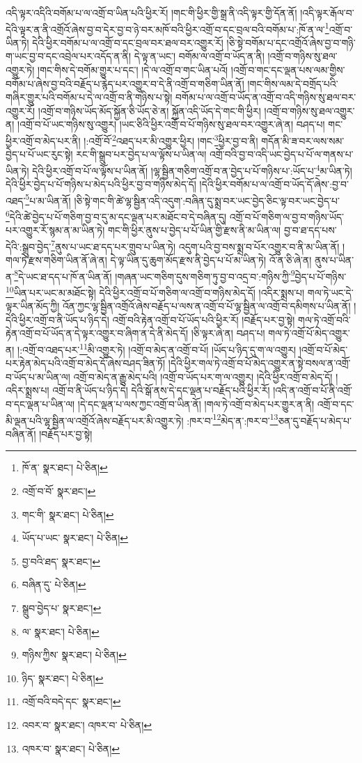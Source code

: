 འདི་ལྟར་འདིའི་བགོམ་པ་ལ་འགྲོ་བ་ཡིན་པའི་ཕྱིར་རོ། །གང་གི་ཕྱིར་གྱི་སྒྲ་ནི་འདི་ལྟར་གྱི་དོན་ནོ། །འདི་ལྟར་རྒོལ་བ་དེའི་ལྟར་ན་ནི་འགྲོའོ་ཞེས་བྱ་བ་དེར་བྱ་བ་ཉེ་བར་མཁོ་བའི་ཕྱིར་འགྲོ་བ་དང་བྲལ་བའི་བགོམ་པ་:ཁོ་ན་ལ་\footnote{ཁོ་ན་  སྣར་ཐང་།  པེ་ཅིན། }འགྲོ་བ་ཡིན་ཏེ། དེའི་ཕྱིར་བགོམ་པ་ལ་འགྲོ་བ་དང་བྲལ་བར་ཐལ་བར་འགྱུར་རོ། །ཅི་སྟེ་བགོམ་པ་དང་འགྲོའོ་ཞེས་བྱ་བ་གཉི་ག་ཡང་བྱ་བ་དང་འབྲེལ་པར་འདོད་ན་ནི། དེ་ལྟ་ན་ཡང་། བགོམ་ལ་འགྲོ་བ་ཡོད་ན་ནི། །འགྲོ་བ་གཉིས་སུ་ཐལ་འགྱུར་ཏེ། །གང་གིས་དེ་བགོམ་གྱུར་པ་དང་། །དེ་ལ་འགྲོ་བ་གང་ཡིན་པའོ། །འགྲོ་བ་གང་དང་ལྡན་པས་ལམ་གྱིས་བགོམ་པ་ཞེས་བྱ་བའི་བརྗོད་པ་རྙེད་པར་འགྱུར་བ་དེ་ནི་འགྲོ་བ་གཅིག་ཡིན་ནོ། །གང་གིས་ལམ་དེ་བགྲོད་པའི་གཞིར་གྱུར་པའི་བགོམ་པ་དེ་ལ་འགྲོ་བ་ནི་གཉིས་པ་སྟེ། བགོམ་པ་ལ་འགྲོ་བ་ཡོད་ན་འགྲོ་བ་འདི་གཉིས་སུ་ཐལ་བར་འགྱུར་རོ། །འགྲོ་བ་གཉིས་ཡོད་མོད་སྐྱོན་ཅི་ཡོད་ཅེ་ན། སྐྱོན་འདི་ཡོད་དེ་གང་གི་ཕྱིར། །འགྲོ་བ་གཉིས་སུ་ཐལ་འགྱུར་ན། །འགྲོ་བ་པོ་ཡང་གཉིས་སུ་འགྱུར། །ཡང་ཅིའི་ཕྱིར་འགྲོ་བ་པོ་གཉིས་སུ་ཐལ་བར་འགྱུར་ཞེ་ན། བཤད་པ། གང་ཕྱིར་འགྲོ་བ་མེད་པར་ནི། །:འགྲོ་བོ་\footnote{འགྲོ་བ་བོ་  སྣར་ཐང་། }འཐད་པར་མི་འགྱུར་ཕྱིར། །གང་\footnote{གང་གི་  སྣར་ཐང་།  པེ་ཅིན། }ཕྱིར་བྱ་བ་ནི། གདོན་མི་ཟ་བར་ལས་སམ་བྱེད་པ་པོ་ཡང་རུང་སྟེ། རང་གི་སྒྲུབ་པར་བྱེད་པ་ལ་ལྟོས་པ་ཡིན་ལ། འགྲོ་བའི་བྱ་བ་འདི་ཡང་བྱེད་པ་པོ་ལ་གནས་པ་ཡིན་ཏེ། དེའི་ཕྱིར་འགྲོ་བ་པོ་ལ་ལྟོས་པ་ཡིན་ནོ། །ལྷ་སྦྱིན་གཅིག་འགྲོ་བ་ན་བྱེད་པ་པོ་གཉིས་པ་:ཡོད་པ་\footnote{ཡོད་པ་ཡང་  སྣར་ཐང་།  པེ་ཅིན། }མ་ཡིན་ཏེ། དེའི་ཕྱིར་བྱེད་པ་པོ་གཉིས་པ་མེད་པའི་ཕྱིར་བྱ་བ་གཉིས་མེད་དོ། །དེའི་ཕྱིར་བགོམ་པ་ལ་འགྲོ་བ་ཡོད་དོ་ཞེས་:བྱ་བ་འཐད་\footnote{བྱ་བའི་ཐད་  སྣར་ཐང་། }པ་མ་ཡིན་ནོ། །ཅི་སྟེ་གང་གི་ཚེ་ལྷ་སྦྱིན་འདི་འདུག་:བཞིན་དུ་སྨྲ་བར་ཡང་བྱེད་ཅིང་ལྟ་བར་ཡང་བྱེད་པ་\footnote{བཞིན་དུ་  པེ་ཅིན། }དེའི་ཚེ་བྱེད་པ་པོ་གཅིག་བྱ་བ་དུ་མ་དང་ལྡན་པར་མཐོང་བ་དེ་བཞིན་དུ། འགྲོ་བ་པོ་གཅིག་ལ་བྱ་བ་གཉིས་ཡོད་པར་འགྱུར་རོ་སྙམ་ན་མ་ཡིན་ཏེ། གང་གི་ཕྱིར་ནུས་པ་བྱེད་པ་པོ་ཡིན་གྱི་རྫས་ནི་མ་ཡིན་ལ། བྱ་བ་ཐ་དད་པས་དེའི་:སྒྲུབ་བྱེད་\footnote{སྒྲུབ་བྱེད་པ་  སྣར་ཐང་། }ནུས་པ་ཡང་ཐ་དད་པར་གྲུབ་པ་ཡིན་ཏེ། འདུག་པའི་བྱ་བས་སྨྲ་བ་པོར་འགྱུར་བ་ནི་མ་ཡིན་ནོ། །གལ་ཏེ་རྫས་གཅིག་ཡིན་ནོ་ཞེ་ན། དེ་ལྟ་ཡིན་དུ་ཆུག་མོད་རྫས་ནི་བྱེད་པ་པོ་མ་ཡིན་ཏེ། འོ་ན་ཅི་ཞེ་ན། ནུས་པ་ཡིན་ན་\footnote{ལ་  སྣར་ཐང་།  པེ་ཅིན། }དེ་ཡང་ཐ་དད་པ་ཁོ་ན་ཡིན་ནོ། །གཞན་ཡང་གཅིག་དུས་གཅིག་ཏུ་བྱ་བ་འདྲ་བ་:གཉིས་ཀྱི་\footnote{གཉིས་ཀྱིས་  སྣར་ཐང་།  པེ་ཅིན། }བྱེད་པ་པོ་གཉིས་\footnote{ཉིད་  སྣར་ཐང་།  པེ་ཅིན། }ཡིན་པར་ཡང་མ་མཐོང་སྟེ། དེའི་ཕྱིར་འགྲོ་བ་པོ་གཅིག་ལ་འགྲོ་བ་གཉིས་མེད་དོ། །འདིར་སྨྲས་པ། གལ་ཏེ་ཡང་དེ་ལྟར་ཡིན་མོད་ཀྱི། འོན་ཀྱང་ལྷ་སྦྱིན་འགྲོའོ་ཞེས་བརྗོད་པ་ལས་ན་འགྲོ་བ་པོ་ལྷ་སྦྱིན་ལ་འགྲོ་བ་དམིགས་པ་ཡིན་ནོ། །དེའི་ཕྱིར་འགྲོ་བ་ནི་ཡོད་པ་ཉིད་དེ། འགྲོ་བའི་རྟེན་འགྲོ་བ་པོ་ཡོད་པའི་ཕྱིར་རོ། །བརྗོད་པར་བྱ་སྟེ། གལ་ཏེ་འགྲོ་བའི་རྟེན་འགྲོ་བ་པོ་ཡོད་ན་དེ་ལྟར་འགྱུར་བ་ཞིག་ན་དེ་ནི་མེད་དོ། །ཅི་ལྟར་ཞེ་ན། བཤད་པ། གལ་ཏེ་འགྲོ་པོ་མེད་འགྱུར་ན། །:འགྲོ་བ་འཐད་པར་\footnote{འགྲོ་བའི་བདེ་དང་  སྣར་ཐང་། }མི་འགྱུར་ཏེ། །འགྲོ་བ་མེད་ན་འགྲོ་བ་པོ། །ཡོད་པ་ཉིད་དུ་ག་ལ་འགྱུར། །འགྲོ་བ་པོ་མེད་པར་རྟེན་མེད་པའི་འགྲོ་བ་མེད་དོ་ཞེས་བཤད་ཟིན་ཏོ། །དེའི་ཕྱིར་གལ་ཏེ་འགྲོ་བ་པོ་མེད་འགྱུར་ན་སྟེ་བསལ་ན་འགྲོ་བ་ཡོད་པ་མ་ཡིན་ལ། འགྲོ་བ་མེད་ན་རྒྱུ་མེད་པའི། །འགྲོ་བ་ཡོད་པར་ག་ལ་འགྱུར། །དེའི་ཕྱིར་འགྲོ་བ་མེད་དོ། །འདིར་སྨྲས་པ། འགྲོ་བ་ནི་ཡོད་པ་ཉིད་དེ། དེའི་སྒོ་ནས་དེ་དང་ལྡན་པ་བརྗོད་པའི་ཕྱིར་རོ། །འདི་ན་འགྲོ་བ་པོ་ནི་འགྲོ་བ་དང་ལྡན་པ་ཡིན་ལ། །དེ་དང་ལྡན་པ་ལས་ཀྱང་འགྲོ་བ་ཡིན་ནོ། །གལ་ཏེ་འགྲོ་བ་མེད་པར་གྱུར་ན་ནི། འགྲོ་བ་དང་མི་ལྡན་པའི་ལྷ་སྦྱིན་ལ་འགྲོའོ་ཞེས་བརྗོད་པར་མི་འགྱུར་ཏེ། :ཁར་བ་\footnote{འབར་བ་  སྣར་ཐང་། འཁར་བ་  པེ་ཅིན། }མེད་ན་:ཁར་བ་\footnote{འཁར་བ་  སྣར་ཐང་།  པེ་ཅིན། }ཅན་དུ་བརྗོད་པ་མེད་པ་བཞིན་ནོ། །བརྗོད་པར་བྱ་སྟེ། 